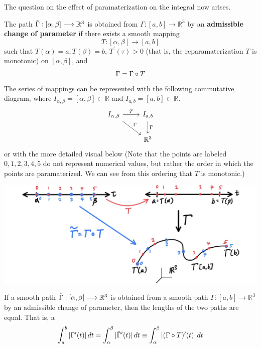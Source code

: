   The question on the effect of paramaterization on the integral now arises. 

  \begin{definition}
    The path $\Tilde{\Gamma}: [\alpha, \beta] \longrightarrow \mathbb{R}^3$ is obtained from $\Gamma: [a, b] \longrightarrow \mathbb{R}^3$ by an \textbf{admissible change of parameter} if there exists a smooth mapping 
    \[T: [\alpha, \beta] \longrightarrow [a, b]\]
    such that $T(\alpha) = a, T(\beta) = b$, $T^\prime (\tau) > 0$ (that is, the reparamaterization $T$ is monotonic) on $[\alpha, \beta]$, and 
    \[\Tilde{\Gamma} = \Gamma \circ T\]
    The series of mappings can be represented with the following commutative diagram, where $I_{\alpha, \beta} = [\alpha, \beta] \subset \mathbb{R}$ and $I_{a, b} = [a, b] \subset \mathbb{R}$. 
    \[
      \begin{tikzcd}
        I_{\alpha, \beta} \arrow{r}{T} \arrow{rd}{\Tilde{\Gamma}}& I_{a, b} \arrow{d}{\Gamma}\\
         & \mathbb{R}^3
      \end{tikzcd}
    \]
    or with the more detailed visual below (Note that the points are labeled $0, 1, 2, 3, 4, 5$ do not represent numerical values, but rather the order in which the points are paramaterized. We can see from this ordering that $T$ is monotonic.)
    \begin{center}
        \includegraphics[scale=0.25]{img/Admissible_Change_of_Parameter.jpg}
    \end{center}
  \end{definition}

  \begin{theorem}
  If a smooth path $\Tilde{\Gamma}: [\alpha, \beta] \longrightarrow \mathbb{R}^3$ is obtained from a smooth path $\Gamma: [a, b] \longrightarrow \mathbb{R}^3$ by an admissible change of parameter, then the lengths of the two paths are equal. That is, a
  \[\int_a^b |\Gamma^\prime (t) |\,dt = \int_\alpha^\beta |\Tilde{\Gamma}^\prime (t)|\,dt \equiv \int_\alpha^\beta |(\Gamma \circ T)^\prime (t)|\,dt\]
  \end{theorem}

